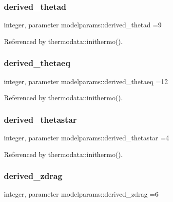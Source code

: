 \subsubsection{\texorpdfstring{derived\+\_\+thetad}{derived\_thetad}}
{\footnotesize\ttfamily integer, parameter modelparams\+::derived\+\_\+thetad =9}



Referenced by thermodata\+::inithermo().

\mbox{\label{namespacemodelparams_aa10d4b47c739162ede20adf21b82dcb7}} 
\subsubsection{\texorpdfstring{derived\+\_\+thetaeq}{derived\_thetaeq}}
{\footnotesize\ttfamily integer, parameter modelparams\+::derived\+\_\+thetaeq =12}



Referenced by thermodata\+::inithermo().

\mbox{\label{namespacemodelparams_af8cbef6429fb7ceac03aa8fe7d0d9875}} 
\subsubsection{\texorpdfstring{derived\+\_\+thetastar}{derived\_thetastar}}
{\footnotesize\ttfamily integer, parameter modelparams\+::derived\+\_\+thetastar =4}



Referenced by thermodata\+::inithermo().

\mbox{\label{namespacemodelparams_a9a7e7cdc5d12b5f40bff2ae559319e44}} 
\subsubsection{\texorpdfstring{derived\+\_\+zdrag}{derived\_zdrag}}
{\footnotesize\ttfamily integer, parameter modelparams\+::derived\+\_\+zdrag =6}



